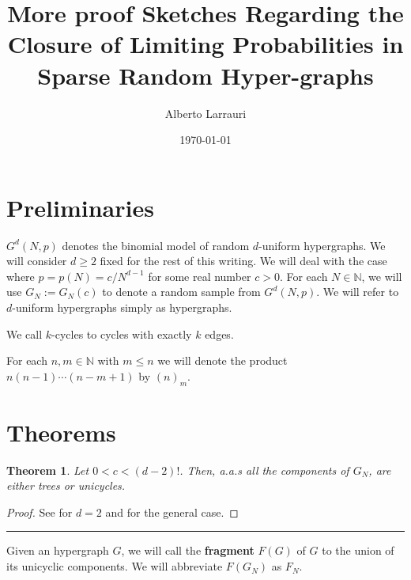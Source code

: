 \documentclass[11pt,notitlepage,a4paper]{article}
\title{More proof Sketches Regarding the Closure of 
	Limiting Probabilities in Sparse Random Hyper-graphs}
\date{\today}
\author{Alberto Larrauri}
\newtheorem{theorem}{Theorem}[section]
\theoremstyle{definition}
\newcommand{\N}{\mathbb{N}}
\begin{document}
	\maketitle 
\section*{Preliminaries}
$G^d(N,p)$ denotes the binomial model of random $d$-uniform hypergraphs. 
We will consider $d\geq 2$ fixed for the rest of this writing. 
We will deal with the case where $p=p(N)= c/N^{d-1}$ for some real number 
$c> 0$. For each $N\in \N$, we will use $G_N:=G_N(c)$ to denote a random sample from $G^d(N,p)$. We will refer to $d$-uniform hypergraphs simply as hypergraphs.

We call $k$-cycles to cycles with exactly $k$ edges.\par

For each $n,m\in \N$ with $m\leq n$ we will
denote the product $n(n-1)\cdots (n-m+1)$ by 
$(n)_m$. 

\section*{Theorems}
\begin{theorem} \label{thm:subcritical}
Let $0<c<(d-2)!$. Then, a.a.s all the components
of $G_N$, are either trees or unicycles.
\end{theorem}
\begin{proof} See \cite{erdHos1960evolution} for $d=2$ and
	\cite{karonski2002phase} for the general case.
\end{proof}
\noindent\rule{2cm}{0.4pt}\par
Given an hypergraph $G$, we will call the \textbf{fragment} $F(G)$
of $G$ to the union of its unicyclic components. We will abbreviate
$F(G_N)$ as $F_N$.
\end{document}
